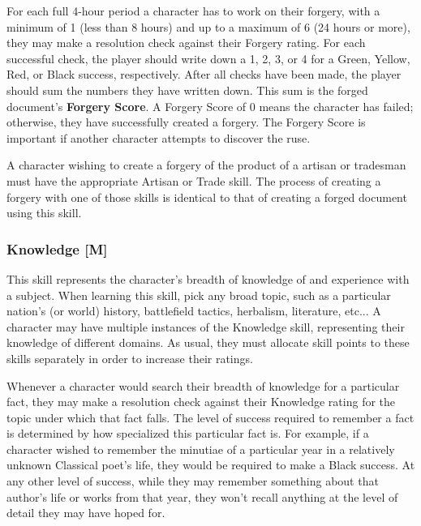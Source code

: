 \documentclass[oneside]{book}
\begin{document}
\begin{multicols}{2}
For each full 4-hour period a character has to work on their forgery, with a minimum of 1 (less than 8 hours) and up to a maximum of 6 (24 hours or more), they may make a resolution check against their Forgery rating. For each successful check, the player should write down a 1, 2, 3, or 4 for a Green, Yellow, Red, or Black success, respectively. After all checks have been made, the player should sum the numbers they have written down. This sum is the forged document's \textbf{Forgery Score}. A Forgery Score of 0 means the character has failed; otherwise, they have successfully created a forgery. The Forgery Score is important if another character attempts to discover the ruse.

A character wishing to create a forgery of the product of a artisan or tradesman must have the appropriate Artisan or Trade skill. The process of creating a forgery with one of those skills is identical to that of creating a forged document using this skill.

\subsubsection{Knowledge [M]}
This skill represents the character's breadth of knowledge of and experience with a subject. When learning this skill, pick any broad topic, such as a particular nation's (or world) history, battlefield tactics, herbalism, literature, etc... A character may have multiple instances of the Knowledge skill, representing their knowledge of different domains. As usual, they must allocate skill points to these skills separately in order to increase their ratings.

Whenever a character would search their breadth of knowledge for a particular fact, they may make a resolution check against their Knowledge rating for the topic under which that fact falls. The level of success required to remember a fact is determined by how specialized this particular fact is. For example, if a character wished to remember the minutiae of a particular year in a relatively unknown Classical poet's life, they would be required to make a Black success. At any other level of success, while they may remember something about that author's life or works from that year, they won't recall anything at the level of detail they may have hoped for.


\end{multicols}
\end{document}
